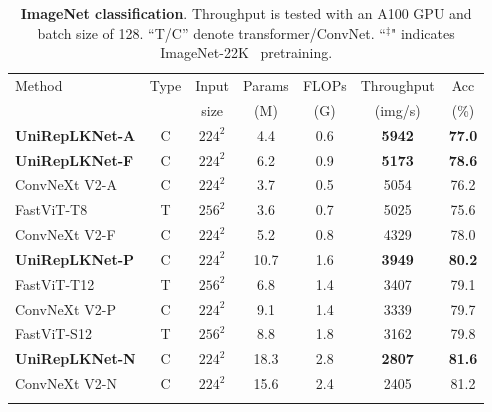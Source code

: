 \documentclass[10pt,twocolumn,letterpaper]{article}
\begin{document}
\begin{table}[t!]
    \centering
    \renewcommand\arraystretch{0.89}
    \setlength{\tabcolsep}{0.9mm}
    \footnotesize
    \caption{\textbf{ImageNet classification}. Throughput is tested with an A100 GPU and batch size of 128. ``T/C'' denote transformer/ConvNet. ``$^\ddagger$" indicates ImageNet-22K~\cite{deng2009imagenet} pretraining.}
    \vspace{-0.1in}
    \begin{tabular}{l|c|c|c|c|c|c}
\hline
    \multirow{2}{*}{Method} & \multirow{2}{*}{Type} & Input & Params & FLOPs & Throughput & Acc \\
    & & size &(M)&(G)&(img/s)&(\%) \\ 
    \hline
    \rowcolor{gray!20}
    \textbf{UniRepLKNet-A}   &   C   &   $224^2$     &   4.4    &   0.6    &   \textbf{5942}    &   \textbf{77.0}    \\
    \rowcolor{gray!20}
    \textbf{UniRepLKNet-F}   &   C   &   $224^2$     &   6.2    &   0.9    &   \textbf{5173}    &    \textbf{78.6}       \\
    ConvNeXt V2-A~\cite{woo2023convnext}   &   C   &   $224^2$     &   3.7    &   0.5    &   5054    &   76.2        \\
    FastViT-T8~\cite{vasu2023fastvit}      &   T   &   $256^2$     &   3.6    &   0.7    &   5025    &   75.6    \\
    ConvNeXt V2-F~\cite{woo2023convnext}   &   C   &   $224^2$     &   5.2    &   0.8    &   4329    &   78.0        \\
    \hline
    \rowcolor{gray!20}
    \textbf{UniRepLKNet-P}   &   C   &   $224^2$   & 10.7 & 1.6    &   \textbf{3949}    &    \textbf{80.2}    \\
    FastViT-T12~\cite{vasu2023fastvit}      &   T   &   $256^2$    &   6.8     &   1.4    &   3407    &   79.1    \\
    ConvNeXt V2-P~\cite{woo2023convnext}   &   C   &   $224^2$     &   9.1    &   1.4   &   3339    &   79.7  \\
    FastViT-S12~\cite{vasu2023fastvit}      &   T   &   $256^2$    &   8.8     &   1.8    &   3162    &   79.8    \\
    \rowcolor{gray!20}
    \textbf{UniRepLKNet-N}   &   C   &   $224^2$ &  18.3&   2.8    &   \textbf{2807}    &    \textbf{81.6}\\
    ConvNeXt V2-N~\cite{woo2023convnext}   &   C   &   $224^2$     &   15.6   &   2.4   &   2405   &   81.2    \\
    \hline
    \rowcolor{gray!20}

\end{tabular}
\end{table}
\end{document}
